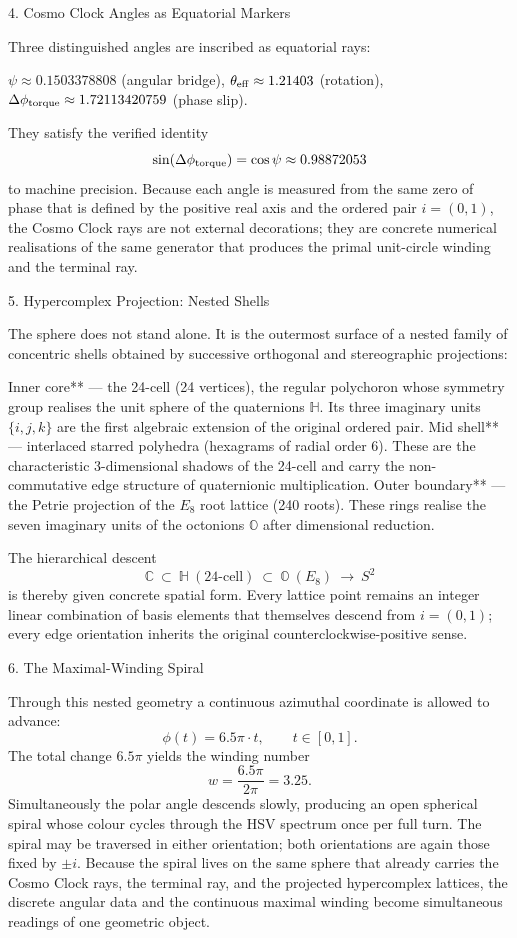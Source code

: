4. Cosmo Clock Angles as Equatorial Markers

Three distinguished angles are inscribed as equatorial rays:

\(\psi\approx 0.1503378808\) (angular bridge),  
\(\theta_{\rm eff}\approx 1.21403\) (rotation),  
\(\Delta\phi_{\rm torque}\approx 1.72113420759\) (phase slip).  

They satisfy the verified identity
\[
\sin(\Delta\phi_{\rm torque})=\cos\psi\approx 0.98872053
\]
to machine precision. Because each angle is measured from the same zero of phase that is defined by the positive real axis and the ordered pair \(i=(0,1)\), the Cosmo Clock rays are not external decorations; they are concrete numerical realisations of the same generator that produces the primal unit-circle winding and the terminal ray.

5. Hypercomplex Projection: Nested Shells

The sphere does not stand alone. It is the outermost surface of a nested family of concentric shells obtained by successive orthogonal and stereographic projections:

Inner core** — the 24-cell (24 vertices), the regular polychoron whose symmetry group realises the unit sphere of the quaternions \(\mathbb{H}\). Its three imaginary units \(\{i,j,k\}\) are the first algebraic extension of the original ordered pair.  
Mid shell** — interlaced starred polyhedra (hexagrams of radial order 6). These are the characteristic 3-dimensional shadows of the 24-cell and carry the non-commutative edge structure of quaternionic multiplication.  
Outer boundary** — the Petrie projection of the \(E_8\) root lattice (240 roots). These rings realise the seven imaginary units of the octonions \(\mathbb{O}\) after dimensional reduction.

The hierarchical descent
\[
\mathbb{C}\ \subset\ \mathbb{H}\ (24\text{-cell})\ \subset\ \mathbb{O}\ (E_8)\ \longrightarrow\ S^2
\]
is thereby given concrete spatial form. Every lattice point remains an integer linear combination of basis elements that themselves descend from \(i=(0,1)\); every edge orientation inherits the original counterclockwise-positive sense.

6. The Maximal-Winding Spiral

Through this nested geometry a continuous azimuthal coordinate is allowed to advance:
\[
\phi(t)=6.5\pi\cdot t,\qquad t\in[0,1].
\]
The total change \(6.5\pi\) yields the winding number
\[
w=\frac{6.5\pi}{2\pi}=3.25.
\]
Simultaneously the polar angle descends slowly, producing an open spherical spiral whose colour cycles through the HSV spectrum once per full turn. The spiral may be traversed in either orientation; both orientations are again those fixed by \(\pm i\). Because the spiral lives on the same sphere that already carries the Cosmo Clock rays, the terminal ray, and the projected hypercomplex lattices, the discrete angular data and the continuous maximal winding become simultaneous readings of one geometric object.

